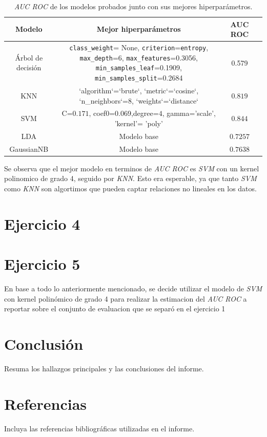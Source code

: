 \documentclass[10pt,a4paper]{article}
\begin{document}
 \begin{table}[H]
    \centering
    \begin{tabular}{|c|c|c|c|}
    \hline
    \textbf{Modelo}  & Mejor hiperparámetros & \textbf{AUC ROC} \\
    \hline
    Árbol de decisión & \texttt{class\_weight}= None, \texttt{criterion}=\texttt{entropy}, \texttt{max\_depth}=6, \texttt{max\_features}=0.3056, \texttt{min\_samples\_leaf}=0.1909, \texttt{min\_samples\_split}=0.2684 & 0.579  \\
    \hline
    KNN & `algorithm`=`brute`, `metric`=`cosine`, `n\_neighbors`=8, `weights`=`distance` & $0.819$ \\
    \hline
    SVM & C=$0.171$, coef0=0.069,degree=$4$, gamma='scale', 'kernel'= 'poly' & $0.844$ \\
    \hline
    LDA & Modelo base & $0.7257$\\
    \hline
    GaussianNB & Modelo base & $0.7638$ \\
    \hline
    \end{tabular}
    \caption{\textit{AUC ROC} de los modelos probados junto con sus mejores hiperparámetros.}
     
    \label{tab:resultados-modelos}
    
 \end{table}

 Se observa que el mejor modelo en terminos de \textit{AUC ROC} es \textit{SVM} con un kernel polinomico de grado 4, seguido por \textit{KNN}. Esto era esperable, 
 ya que tanto \textit{SVM} como \textit{KNN} son algortimos que pueden captar relaciones no lineales en los datos.
\section{Ejercicio 4}

\section{Ejercicio 5}
En base a todo lo anteriormente mencionado, se decide utilizar el modelo de \textit{SVM} con kernel polinómico de grado 4 para realizar la estimacion del \textit{AUC ROC} a reportar sobre el conjunto de evaluacion que se separó en el ejercicio 1

\section{Conclusión}
Resuma los hallazgos principales y las conclusiones del informe.

\section*{Referencias}
Incluya las referencias bibliográficas utilizadas en el informe.
\end{document}
